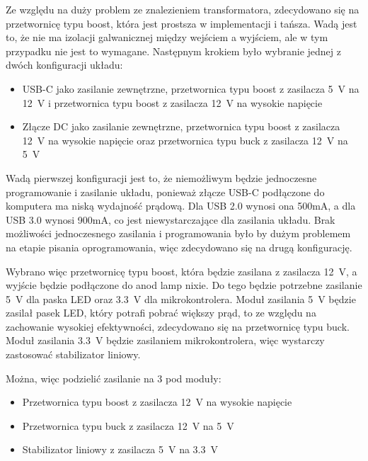 \documentclass[../main.tex]{subfiles}
\begin{document}
Ze względu na duży problem ze znalezieniem transformatora, zdecydowano się na przetwornicę typu boost, która jest prostsza w implementacji i tańsza. 
Wadą jest to, że nie ma izolacji galwanicznej między wejściem a wyjściem, ale w tym przypadku nie jest to wymagane.
Następnym krokiem było wybranie jednej z dwóch konfiguracji układu:

\begin{itemize}
    \item USB-C jako zasilanie zewnętrzne, przetwornica typu boost z zasilacza \SI{5}{\volt} na \SI{12}{\volt} i przetwornica typu boost z zasilacza \SI{12}{\volt} na wysokie napięcie
    \item Złącze DC jako zasilanie zewnętrzne, przetwornica typu boost z zasilacza \SI{12}{\volt} na wysokie napięcie oraz przetwornica typu buck z zasilacza \SI{12}{\volt} na \SI{5}{\volt}
\end{itemize}

Wadą pierwszej konfiguracji jest to, że niemożliwym będzie jednoczesne programowanie i zasilanie układu, ponieważ złącze USB-C podłączone do komputera ma niską wydajność prądową.
Dla USB 2.0 wynosi ona 500mA, a dla USB 3.0 wynosi 900mA, co jest niewystarczające dla zasilania układu. Brak możliwości jednoczesnego zasilania i programowania było by 
dużym problemem na etapie pisania oprogramowania, więc zdecydowano się na drugą konfigurację.

Wybrano więc przetwornicę typu boost, która będzie zasilana z zasilacza \SI{12}{\volt}, a wyjście będzie podłączone do anod lamp nixie.
Do tego będzie potrzebne zasilanie \SI{5}{\volt} dla paska LED oraz \SI{3.3}{\volt} dla mikrokontrolera. Moduł zasilania \SI{5}{\volt} będzie zasilał pasek LED, który potrafi pobrać większy prąd,
to ze względu na zachowanie wysokiej efektywności, zdecydowano się na przetwornicę typu buck. Moduł zasilania \SI{3.3}{\volt} będzie zasilaniem mikrokontrolera, więc wystarczy zastosować
stabilizator liniowy.

Można, więc podzielić zasilanie na 3 pod moduły:
\begin{itemize}
    \item Przetwornica typu boost z zasilacza \SI{12}{\volt} na wysokie napięcie
    \item Przetwornica typu buck z zasilacza \SI{12}{\volt} na \SI{5}{\volt}
    \item Stabilizator liniowy z zasilacza \SI{5}{\volt} na \SI{3.3}{\volt}
\end{itemize}
\end{document}
